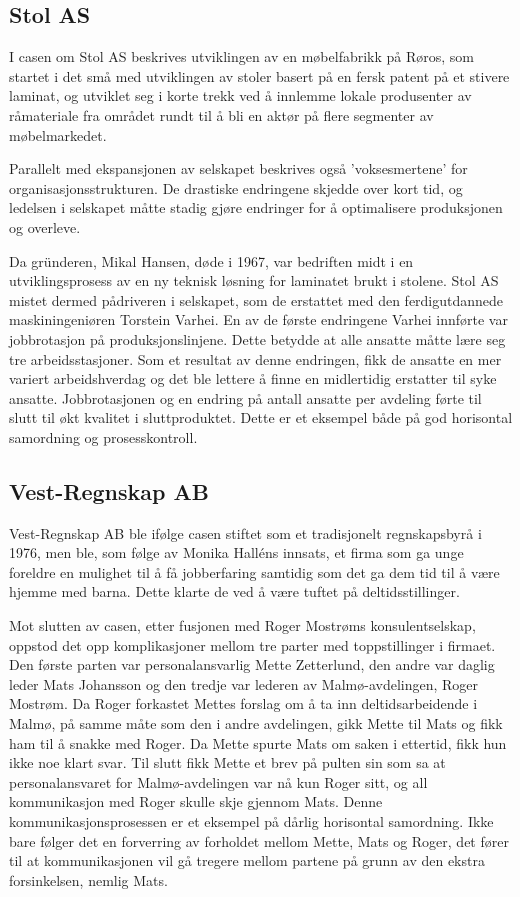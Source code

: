 \documentclass[11]{article}
\begin{document}
\subsection{Stol AS}
I casen om Stol AS beskrives utviklingen av en møbelfabrikk på Røros, som startet i det små med utviklingen av stoler basert på en fersk patent på et stivere laminat, og utviklet seg i korte trekk ved å innlemme lokale produsenter av råmateriale fra området rundt til å bli en aktør på flere segmenter av møbelmarkedet.

Parallelt med ekspansjonen av selskapet beskrives også 'voksesmertene' for organisasjonsstrukturen. De drastiske endringene skjedde over kort tid, og ledelsen i selskapet måtte stadig gjøre endringer for å optimalisere produksjonen og overleve.

Da gründeren, Mikal Hansen, døde i 1967, var bedriften midt i en utviklingsprosess av en ny teknisk løsning for laminatet brukt i stolene. Stol AS mistet dermed pådriveren i selskapet, som de erstattet med den ferdigutdannede maskiningeniøren Torstein Varhei. En av de første endringene Varhei innførte var jobbrotasjon på produksjonslinjene. Dette betydde at alle ansatte måtte lære seg tre arbeidsstasjoner. Som et resultat av denne endringen, fikk de ansatte en mer variert arbeidshverdag og det ble lettere å finne en midlertidig erstatter til syke ansatte. Jobbrotasjonen og en endring på antall ansatte per avdeling førte til slutt til økt kvalitet i sluttproduktet. Dette er et eksempel både på god horisontal samordning og prosesskontroll.

\subsection{Vest-Regnskap AB}
Vest-Regnskap AB ble ifølge casen stiftet som et tradisjonelt regnskapsbyrå i 1976, men ble, som følge av Monika Halléns innsats, et firma som ga unge foreldre en mulighet til å få jobberfaring samtidig som det ga dem tid til å være hjemme med barna. Dette klarte de ved å være tuftet på deltidsstillinger. 

Mot slutten av casen, etter fusjonen med Roger Mostrøms konsulentselskap, oppstod det opp komplikasjoner mellom tre parter med toppstillinger i firmaet. Den første parten var personalansvarlig Mette Zetterlund, den andre var daglig leder Mats Johansson og den tredje var lederen av Malmø-avdelingen, Roger Mostrøm. Da Roger forkastet Mettes forslag om å ta inn deltidsarbeidende i Malmø, på samme måte som den i andre avdelingen, gikk Mette til Mats og fikk ham til å snakke med Roger. Da Mette spurte Mats om saken i ettertid, fikk hun ikke noe klart svar. Til slutt fikk Mette et brev på pulten sin som sa at personalansvaret for Malmø-avdelingen var nå kun Roger sitt, og all kommunikasjon med Roger skulle skje gjennom Mats. Denne kommunikasjonsprosessen er et eksempel på dårlig horisontal samordning. Ikke bare følger det en forverring av forholdet mellom Mette, Mats og Roger, det fører til at kommunikasjonen vil gå tregere mellom partene på grunn av den ekstra forsinkelsen, nemlig Mats.  
\end{document}

